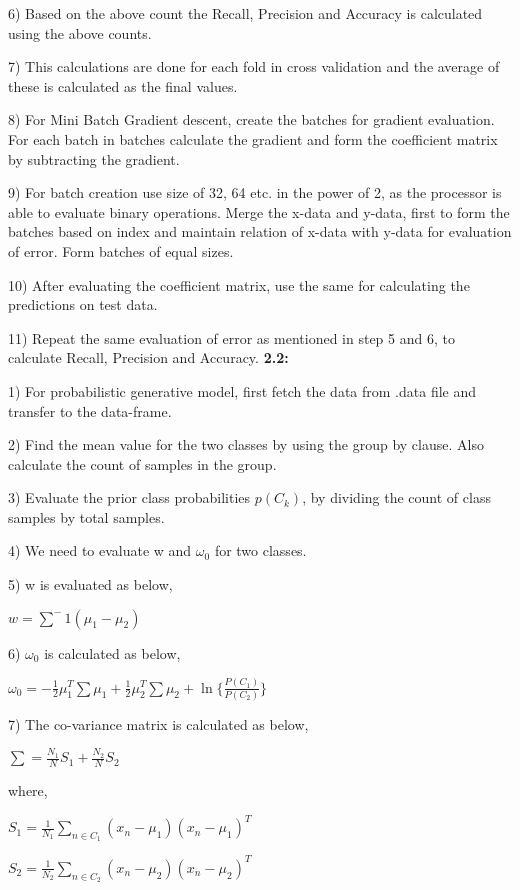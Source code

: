 \documentclass{exam}
\begin{document}
\begin{questions}
6) Based on the above count the Recall, Precision and Accuracy is calculated using the above counts.

7) This calculations are done for each fold in cross validation and the average of these is calculated as the final values.

8) For Mini Batch Gradient descent, create the batches for gradient evaluation. For each batch in batches calculate the gradient and form the coefficient matrix by subtracting the gradient.

9) For batch creation use size of 32, 64 etc. in the power of 2, as the processor is able to evaluate binary operations. Merge the x-data and y-data, first to form the batches based on index and maintain relation of x-data with y-data for evaluation of error. Form batches of equal sizes.

10) After evaluating the coefficient matrix, use the same for calculating the predictions on test data.

11) Repeat the same evaluation of error as mentioned in step 5 and 6, to calculate Recall, Precision and Accuracy.
\newpage
\textbf{2.2:}

1) For probabilistic generative model, first fetch the data from .data file and transfer to the data-frame.

2) Find the mean value for the two classes by using the group by clause. Also calculate the count of samples in the group.

3) Evaluate the prior class probabilities $p(C_{k})$, by dividing the count of class samples by total samples.

4) We need to evaluate w and $\omega_{0}$ for two classes.

5) w is evaluated as below,

$w = \sum^-1 (\mu_{1} - \mu_{2}) $ 

6) $\omega_{0}$ is calculated as below,

$\omega_{0} = - \frac{1}{2} \mu_{1}^T \sum \mu_{1} + \frac{1}{2} \mu_{2}^T \sum \mu_{2} + \ln\{ \frac{P(C_{1})}{P(C_{2})} \}$

7) The co-variance matrix is calculated as below,

$\sum = \frac{N_{1}}{N}S_{1} + \frac{N_{2}}{N}S_{2} $

where,

$S_{1} = \frac{1}{N_{1}} \sum_{n\in{C_{1}}} (x_{n} - \mu_{1})(x_{n} - \mu_{1})^T $

$S_{2} = \frac{1}{N_{2}} \sum_{n\in{C_{2}}} (x_{n} - \mu_{2})(x_{n} - \mu_{2})^T$


\end{questions}
\end{document}
